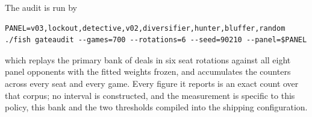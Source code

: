 The audit is run by

\begin{verbatim}
PANEL=v03,lockout,detective,v02,diversifier,hunter,bluffer,random
./fish gateaudit --games=700 --rotations=6 --seed=90210 --panel=$PANEL
\end{verbatim}

which replays the primary bank of \numHtHDeals{} deals in six seat rotations
against all eight panel opponents with the fitted weights frozen, and
accumulates the counters across every seat and every game. Every figure it
reports is an exact count over that corpus; no interval is constructed, and the
measurement is specific to this policy, this bank and the two thresholds
compiled into the shipping configuration.
